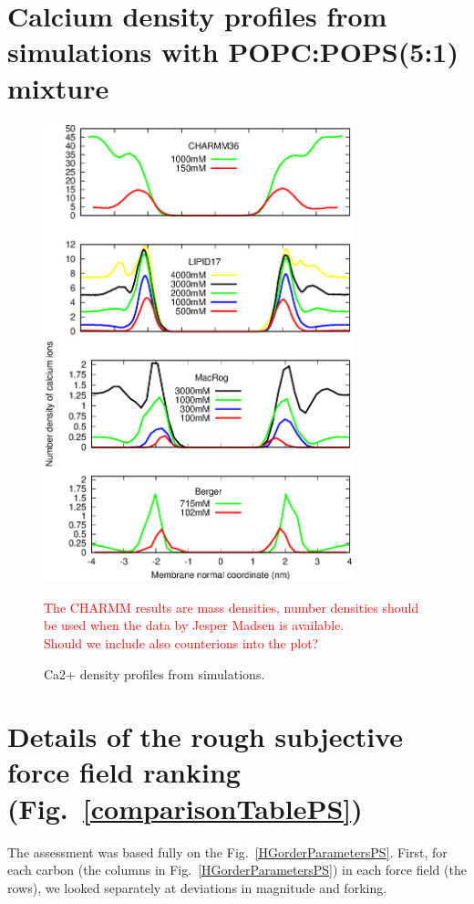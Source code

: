 \documentclass[journal=jpcbfk]{achemso}
\newcommand{\todo}[1]{\textcolor{red}{#1}}
\begin{document}
\pagebreak
\section{Calcium density profiles from simulations with POPC:POPS(5:1) mixture}
\begin{figure}[ht]
  \centering
  \includegraphics[width=9cm]{../Figs/CAdensPCPSmixture.eps}
  \caption{\label{CAdensPCPSmixtureALL}
    Ca2+ density profiles from simulations.
  }
  \todo{The CHARMM results are mass densities, number densities should be used when the data by Jesper Madsen is available.} \\
  \todo{Should we include also counterions into the plot?} \\
\end{figure}

\pagebreak
\section{Details of the rough subjective force field ranking (Fig.~\ref{comparisonTablePS})} 

The assessment was based fully on the Fig.~\ref{HGorderParametersPS}.
%
First, for each carbon (the columns in Fig.~\ref{HGorderParametersPS}) in each force field (the rows),
we looked separately at deviations in magnitude and forking.
\end{document}

